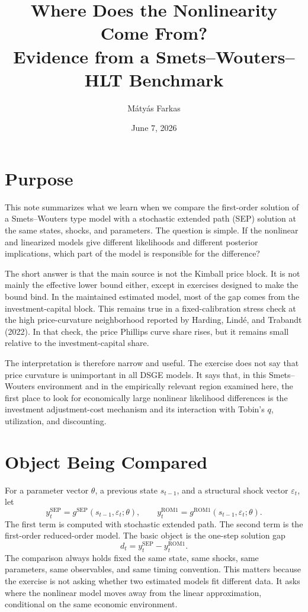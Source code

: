 \documentclass[10pt]{article}
\title{\vspace{-2.5em}Where Does the Nonlinearity Come From?\\
\large Evidence from a Smets--Wouters--HLT Benchmark}
\author{M\'aty\'as Farkas}
\date{June 7, 2026}
\begin{document}
\maketitle
\vspace{-1.7em}

\section*{Purpose}

This note summarizes what we learn when we compare the first-order solution of a Smets--Wouters type model with a stochastic extended path (SEP) solution at the same states, shocks, and parameters. The question is simple. If the nonlinear and linearized models give different likelihoods and different posterior implications, which part of the model is responsible for the difference?

The short answer is that the main source is not the Kimball price block. It is not mainly the effective lower bound either, except in exercises designed to make the bound bind. In the maintained estimated model, most of the gap comes from the investment-capital block. This remains true in a fixed-calibration stress check at the high price-curvature neighborhood reported by Harding, Lind\'e, and Trabandt (2022). In that check, the price Phillips curve share rises, but it remains small relative to the investment-capital share.

The interpretation is therefore narrow and useful. The exercise does not say that price curvature is unimportant in all DSGE models. It says that, in this Smets--Wouters environment and in the empirically relevant region examined here, the first place to look for economically large nonlinear likelihood differences is the investment adjustment-cost mechanism and its interaction with Tobin's $q$, utilization, and discounting.

\section*{Object Being Compared}

For a parameter vector $\theta$, a previous state $s_{t-1}$, and a structural shock vector $\varepsilon_t$, let
\[
  y_t^{\mathrm{SEP}} = g^{\mathrm{SEP}}(s_{t-1},\varepsilon_t;\theta),
  \qquad
  y_t^{\mathrm{ROM1}} = g^{\mathrm{ROM1}}(s_{t-1},\varepsilon_t;\theta).
\]
The first term is computed with stochastic extended path. The second term is the first-order reduced-order model. The basic object is the one-step solution gap
\[
  d_t = y_t^{\mathrm{SEP}} - y_t^{\mathrm{ROM1}}.
\]
The comparison always holds fixed the same state, same shocks, same parameters, same observables, and same timing convention. This matters because the exercise is not asking whether two estimated models fit different data. It asks where the nonlinear model moves away from the linear approximation, conditional on the same economic environment.
\end{document}
